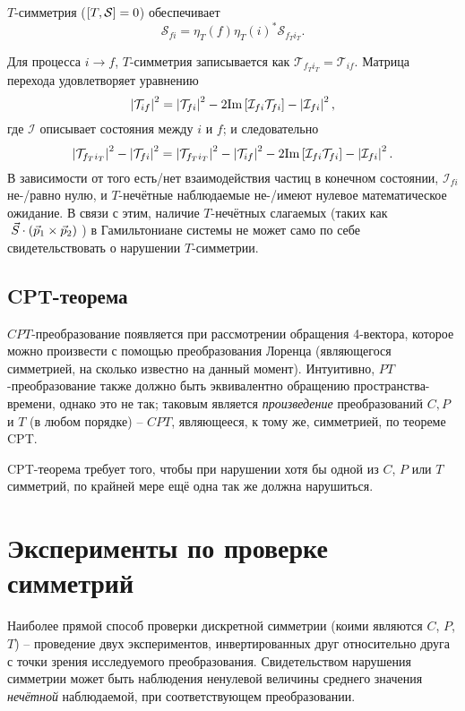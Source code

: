 \documentclass[14pt]{extarticle}
\newcommand{\SMatrix}{\mathcal{S}}
\newcommand{\TMatrix}{\mathcal{T}}
\newcommand{\IMatrix}{\mathcal{I}}
\begin{document}
$T$-симметрия ($\sqB{T, \SMatrix} = 0$) обеспечивает 
\[
\SMatrix_{fi} = \eta_T(f)\eta_T(i)^*\SMatrix_{f_T i_T}.
\]

Для процесса $i\to f$, $T$-симметрия записывается как $\TMatrix_{f_T i_T} = \TMatrix_{if}$. Матрица перехода удовлетворяет уравнению 
\[
\Mod{\TMatrix_{if}}^2 = \Mod{\TMatrix_{fi}}^2 - 2\Im{\IMatrix_{fi}\TMatrix_{fi}} - \Mod{\IMatrix_{fi}}^2,
\]
где $\IMatrix$ описывает состояния между $i$ и $f$; и следовательно
\[
\Mod{\TMatrix_{f_T i_T}}^2 - \Mod{\TMatrix_{fi}}^2 = \Mod{\TMatrix_{f_T i_T}}^2 - \Mod{\TMatrix_{if}}^2 - 2\Im{\IMatrix_{fi}\TMatrix_{fi}} - \Mod{\IMatrix_{fi}}^2.
\]
В зависимости от того есть/нет взаимодействия частиц в конечном состоянии, $\IMatrix_{fi}$ не-/равно нулю, и $T$-нечётные наблюдаемые не-/имеют нулевое математическое ожидание. В связи с этим, наличие $T$-нечётных слагаемых (таких как $\dotprod{\vec S}{\rndB{\xprod{\vec p_1}{\vec p_2}}}$) в Гамильтониане системы не может само по себе свидетельствовать о нарушении $T$-симметрии.~\cite[стр. 146]{Symmetries}

\subsection{CPT-теорема} 

$CPT$-преобразование появляется при рассмотрении обращения 4-вектора, которое можно произвести с помощью преобразования Лоренца (являющегося симметрией, на сколько известно на данный момент). Интуитивно, $PT$-преобразование также должно быть эквивалентно обращению пространства-времени, однако это не так; таковым является \emph{произведение} преобразований $C, P$ и $T$ (в любом порядке) -- $CPT$, являющееся, к тому же, симметрией, по теореме CPT. 

CPT-теорема требует того, чтобы при нарушении хотя бы одной из $C$, $P$ или $T$ симметрий, по крайней мере ещё одна так же должна нарушиться. 


\section{Эксперименты по проверке симметрий}

Наиболее прямой способ проверки дискретной симметрии (коими являются $C$, $P$, $T$) -- проведение двух экспериментов, инвертированных друг относительно друга с точки зрения исследуемого преобразования.
%
Свидетельством нарушения симметрии может быть наблюдения ненулевой величины среднего значения \emph{нечётной} наблюдаемой, при соответствующем преобразовании.~\cite[стр. 12]{Symmetries}
\end{document}
